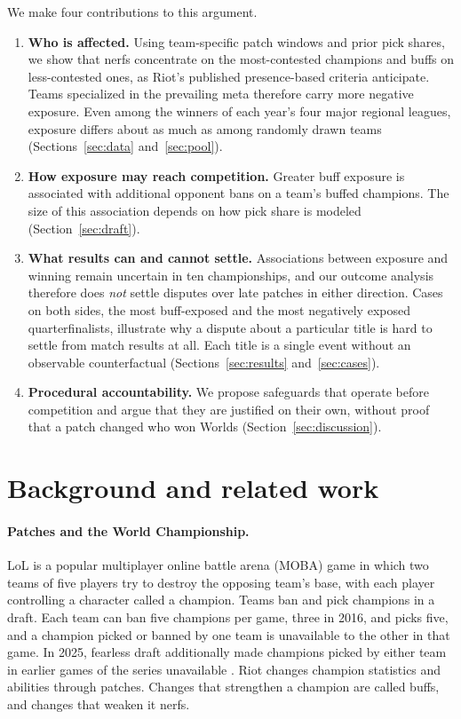 \documentclass[11pt]{article}
\begin{document}
We make four contributions to this argument.
\begin{enumerate}
\item \textbf{Who is affected.} Using team-specific patch windows and prior pick shares, we show that nerfs concentrate on the most-contested champions and buffs on less-contested ones, as Riot's published presence-based criteria anticipate. Teams specialized in the prevailing meta therefore carry more negative exposure. Even among the winners of each year's four major regional leagues, exposure differs about as much as among randomly drawn teams (Sections~\ref{sec:data} and~\ref{sec:pool}).
\item \textbf{How exposure may reach competition.} Greater buff exposure is associated with additional opponent bans on a team's buffed champions. The size of this association depends on how pick share is modeled (Section~\ref{sec:draft}).
\item \textbf{What results can and cannot settle.} Associations between exposure and winning remain uncertain in ten championships, and our outcome analysis therefore does \emph{not} settle disputes over late patches in either direction. Cases on both sides, the most buff-exposed and the most negatively exposed quarterfinalists, illustrate why a dispute about a particular title is hard to settle from match results at all. Each title is a single event without an observable counterfactual (Sections~\ref{sec:results} and~\ref{sec:cases}).
\item \textbf{Procedural accountability.} We propose safeguards that operate before competition and argue that they are justified on their own, without proof that a patch changed who won Worlds (Section~\ref{sec:discussion}).
\end{enumerate}

\section{Background and related work}
\label{sec:background}

\paragraph{Patches and the World Championship.} LoL is a popular multiplayer online battle arena (MOBA) game in which two teams of five players try to destroy the opposing team's base, with each player controlling a character called a champion. Teams ban and pick champions in a draft. Each team can ban five champions per game, three in 2016, and picks five, and a champion picked or banned by one team is unavailable to the other in that game. In 2025, fearless draft additionally made champions picked by either team in earlier games of the series unavailable \citep{riot2025fearless}. Riot changes champion statistics and abilities through patches. Changes that strengthen a champion are called buffs, and changes that weaken it nerfs.
\end{document}
